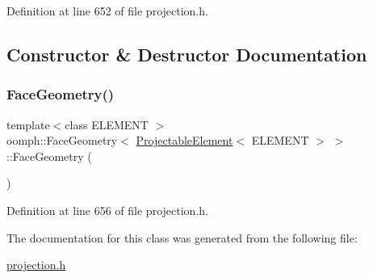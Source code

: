 Definition at line 652 of file projection.\+h.



\subsection{Constructor \& Destructor Documentation}
\mbox{\label{classoomph_1_1FaceGeometry_3_01ProjectableElement_3_01ELEMENT_01_4_01_4_a62c7dbbd61666c35f66cb028468bd110}} 
\subsubsection{\texorpdfstring{Face\+Geometry()}{FaceGeometry()}}
{\footnotesize\ttfamily template$<$class E\+L\+E\+M\+E\+NT $>$ \\
oomph\+::\+Face\+Geometry$<$ \hyperlink{classoomph_1_1ProjectableElement}{Projectable\+Element}$<$ E\+L\+E\+M\+E\+NT $>$ $>$\+::Face\+Geometry (\begin{DoxyParamCaption}{ }\end{DoxyParamCaption})\hspace{0.3cm}{\ttfamily [inline]}}



Definition at line 656 of file projection.\+h.



The documentation for this class was generated from the following file\+:\begin{DoxyCompactItemize}
\item 
\hyperlink{projection_8h}{projection.\+h}\end{DoxyCompactItemize}
